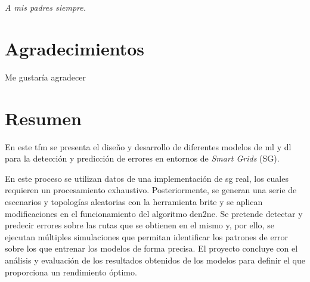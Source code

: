 

\cleardoublepage %
\chapter*{}
\setlength{\leftmargin}{0.5\textwidth}
\setlength{\parsep}{0cm}
\addtolength{\topsep}{0.5cm}
\begin{flushright}
	\small\em{
		A mis padres siempre.
	}
\end{flushright}

 


\chapter*{Agradecimientos}

\thispagestyle{empty}
\vspace{1cm}

Me gustaría agradecer

\cleardoublepage %



\chapter{Resumen}
\thispagestyle{empty}
En este \gls{tfm} se presenta el diseño y desarrollo de diferentes modelos de \gls{ml} y \gls{dl} para la detección y predicción de errores en entornos de \textit{Smart Grids} (SG).

\vspace{3mm}

En este proceso se utilizan datos de una implementación de \gls{sg} real, los cuales requieren un procesamiento exhaustivo. Posteriormente, se generan una serie de escenarios y topologías aleatorias con la herramienta \acrshort{brite} y se aplican modificaciones en el funcionamiento del algoritmo \acrshort{den2ne}. Se pretende detectar y predecir errores sobre las rutas que se obtienen en el mismo y, por ello, se ejecutan múltiples simulaciones que permitan identificar los patrones de error sobre los que entrenar los modelos de forma precisa. El proyecto concluye con el análisis y evaluación de los resultados obtenidos de los modelos para definir el que proporciona un rendimiento óptimo.

